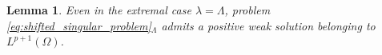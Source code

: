 \documentclass[11pt]{article}
\newtheorem{lemma}{Lemma}[section] %
\begin{document}




\begin{lemma}
Even in the extremal case $\lambda = \Lambda$, problem \eqref{eq:shifted_singular_problem}$_\Lambda$ admits a positive weak solution belonging to $L^{p+1}(\Omega)$.
\end{lemma}

\end{document}
